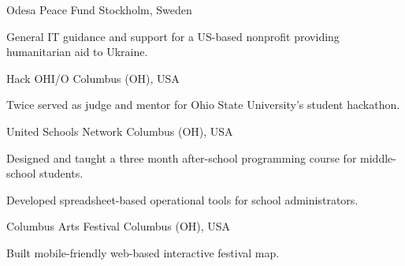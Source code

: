 

\begin{cventries}

  \cventryshort
    {Odesa Peace Fund} %
    {Stockholm, Sweden} %
    {
      \begin{cvitems} %
        \item {General IT guidance and support for a US-based nonprofit providing humanitarian aid to Ukraine.}
      \end{cvitems}
    }

  \cventryshort
    {Hack OHI/O} %
    {Columbus (OH), USA} %
    {
      \begin{cvitems} %
        \item {Twice served as judge and mentor for Ohio State University's student hackathon.}
      \end{cvitems}
    }

  \cventryshort
    {United Schools Network} %
    {Columbus (OH), USA} %
    {
      \begin{cvitems} %
        \item {Designed and taught a three month after-school programming course for middle-school students.}
        \item {Developed spreadsheet-based operational tools for school administrators.}
      \end{cvitems}
    }

  \cventryshort
    {Columbus Arts Festival} %
    {Columbus (OH), USA} %
    {
      \begin{cvitems} %
        \item {Built mobile-friendly web-based interactive festival map.}
      \end{cvitems}
    }

\end{cventries}
